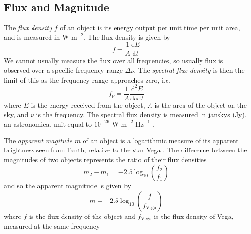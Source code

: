 



        \subsection{Flux and Magnitude}

            The \emph{flux density} $f$ of an object is its energy output per
            unit time per unit area, and is measured in $\text{W m}^{-2}$. The
            flux density is given by
            \[
                f = \frac{1}{A}\frac{\text{d}E}{\text{d}t}
            \]
            We cannot usually measure the flux over all frequencies, so usually
            flux is observed over a specific frequency range $\Delta \nu$. The
            \emph{spectral flux density} is then the limit of this as the
            frequency range approaches zero, i.e.
            \[
                f_\nu = \frac{1}{A}\frac{\text{d}^2E}{\text{d}\nu\text{d}t}
            \]
            where $E$ is the energy received from the object, $A$ is the area of
            the object on the sky, and $\nu$ is the frequency. The spectral flux
            density is measured in janskys (Jy), an astronomical unit equal to
            $10^{-26} \text{ W m}^{-2} \text{ Hz}^{-1}$ \citep{francis08}.

            The \emph{apparent magitude} $m$ of an object is a logarithmic
            measure of its apparent brightness seen from Earth, relative to the
            star Vega \citep{francis08}. The difference between the magnitudes
            of two objects represents the ratio of their flux densities
            \begin{equation}
                \label{eq:magnitude-difference}
                m_2 - m_1 = -2.5 \log_{10} \left(\frac{f_2}{f_1}\right)
            \end{equation}
            and so the apparent magnitude is given by
            \begin{equation}
                \label{eq:apparent-magnitude}
                m = -2.5 \log_{10} \left(\frac{f}{f_{\text{Vega}}}\right)
            \end{equation}
            where $f$ is the flux density of the object and $f_{\text{Vega}}$ is
            the flux density of Vega, measured at the same frequency.

